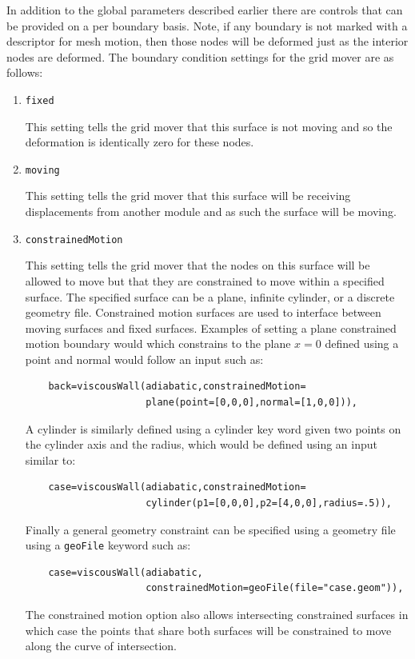 In addition to the global parameters described earlier there are controls that can be provided on a per boundary basis.  Note, if any boundary is not marked with a descriptor for mesh motion, then those nodes will be deformed just as the interior nodes are deformed.  The boundary condition settings for the grid mover are as follows:
\begin{enumerate}
  \item {\tt fixed}

    This setting tells the grid mover that this surface is not moving
    and so the deformation is identically zero for these nodes.

  \item {\tt moving}

    This setting tells the grid mover that this surface will be
    receiving displacements from another module and as such the
    surface will be moving.

  \item {\tt constrainedMotion}

    This setting tells the grid mover that the nodes on this surface
    will be allowed to move but that they are constrained to move
    within a specified surface.  The specified surface can be a plane,
    infinite cylinder, or a discrete geometry file.  Constrained
    motion surfaces are used to interface between moving surfaces and
    fixed surfaces.  Examples of setting a plane constrained motion boundary would which constrains to the plane $x=0$ defined using a point and normal would follow an input such as:
\begin{verbatim}
    back=viscousWall(adiabatic,constrainedMotion=
                     plane(point=[0,0,0],normal=[1,0,0])),
\end{verbatim}
    A cylinder is  similarly defined using a cylinder key word given two points on the cylinder axis and the radius, which would be defined using an input similar to:
\begin{verbatim}
    case=viscousWall(adiabatic,constrainedMotion=
                     cylinder(p1=[0,0,0],p2=[4,0,0],radius=.5)),
\end{verbatim}
    Finally a general geometry constraint can be specified using a geometry file using a {\tt geoFile} keyword such as:
\begin{verbatim}
    case=viscousWall(adiabatic,
                     constrainedMotion=geoFile(file="case.geom")),
\end{verbatim}
    The constrained motion option also allows intersecting constrained surfaces in which case the points that share both surfaces will be constrained to move along the curve of intersection.


\end{enumerate}
